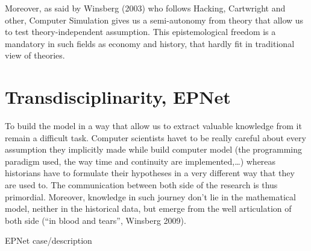 \documentclass[a4paper]{article}
\begin{document}
Moreover, as said by Winsberg (2003) who follows Hacking, Cartwright and other, Computer Simulation gives us a semi-autonomy from theory that allow us to test theory-independent assumption. This epistemological freedom is a mandatory in such fields as economy and history, that hardly fit in traditional view of theories.


\section{Transdisciplinarity, EPNet}

To build the model in a way that allow us to extract valuable knowledge from it remain a difficult task. Computer scientists havet to be really careful about every assumption they implicitly made while build computer model (the programming paradigm used, the way time and continuity are implemented,\ldots) whereas historians have to formulate their hypotheses in a very different way that they are used to. The communication between both side of the research is thus primordial. Moreover, knowledge in such journey don't lie in the mathematical model, neither in the historical data, but emerge from the well articulation of both side (``in blood and tears'', Winsberg 2009).

EPNet case/description
\end{document}
